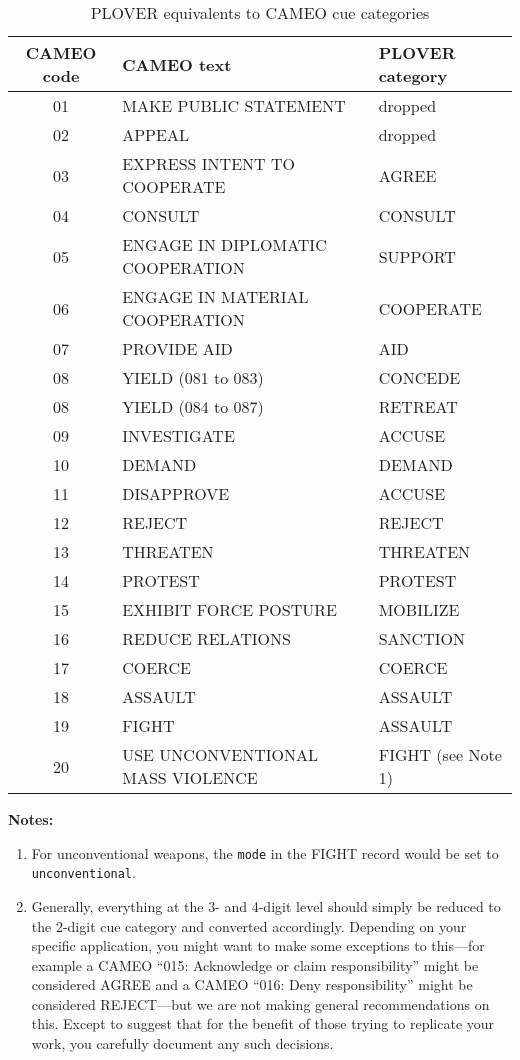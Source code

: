 \documentclass[11pt]{report}
\newcommand{\plcat}[1]{\textsf{#1}}
\newcommand{\plmod}[1]{\texttt{#1}}
\newcommand{\txt}[1]{\texttt{#1}}
\begin{document}
{\begin{table}[htp]
\caption{PLOVER equivalents to CAMEO cue categories}
\begin{center}
\begin{tabular}{|c|l|l|}
\hline
CAMEO code & CAMEO text & PLOVER category \\
\hline
01 & MAKE PUBLIC STATEMENT & dropped \\
02 & APPEAL & dropped \\
03 & EXPRESS INTENT TO COOPERATE & AGREE \\
04 & CONSULT & CONSULT \\
05 & ENGAGE IN DIPLOMATIC COOPERATION & SUPPORT \\
06 & ENGAGE IN MATERIAL COOPERATION & COOPERATE \\
07 & PROVIDE AID & AID \\
08 & YIELD (081 to 083) & CONCEDE \\
08 & YIELD (084 to 087) & RETREAT \\
09 & INVESTIGATE & ACCUSE \\
10 & DEMAND & DEMAND \\
11 & DISAPPROVE & ACCUSE \\
12 & REJECT & REJECT \\
13 & THREATEN & THREATEN \\
14 & PROTEST & PROTEST \\
15& EXHIBIT FORCE POSTURE & MOBILIZE \\
16 & REDUCE RELATIONS & SANCTION \\
17 & COERCE & COERCE \\
18 & ASSAULT & ASSAULT \\
19 & FIGHT & ASSAULT \\
20 & USE UNCONVENTIONAL MASS VIOLENCE & FIGHT (see Note 1) \\
\hline

\end{tabular}
\end{center}
\label{tab:xlate}
\end{table}%

\noindent \textbf{Notes:}

\begin{enumerate}
\item For unconventional weapons, the  \txt{mode} in the \plcat{FIGHT} record would be set to \plmod{unconventional}. \item Generally, everything at the 3- and 4-digit level should simply be reduced to the 2-digit cue category and converted accordingly. Depending on your specific application, you might want to make some exceptions to this---for example a CAMEO  ``015: Acknowledge or claim responsibility'' might be considered \plcat{AGREE} and a CAMEO ``016: Deny responsibility'' might be considered REJECT---but we are not making general recommendations on this. Except to suggest that for the benefit of those trying to replicate your work, you carefully document any such decisions.
\end{enumerate}


}
\end{document}
